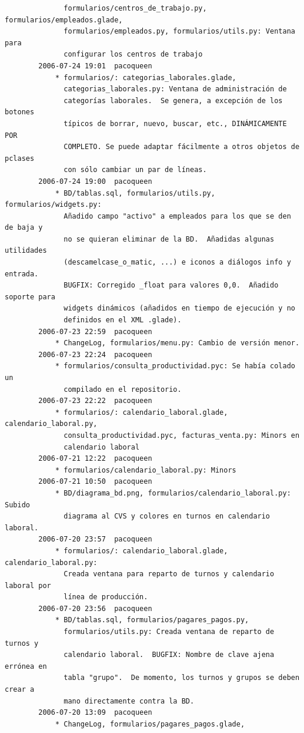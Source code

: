 \documentclass[a4paper]{article}
\begin{document}
\begin{verbatim}
              formularios/centros_de_trabajo.py, formularios/empleados.glade,
              formularios/empleados.py, formularios/utils.py: Ventana para
              configurar los centros de trabajo
        2006-07-24 19:01  pacoqueen
            * formularios/: categorias_laborales.glade,
              categorias_laborales.py: Ventana de administración de
              categorías laborales.  Se genera, a excepción de los botones
              típicos de borrar, nuevo, buscar, etc., DINÁMICAMENTE POR
              COMPLETO. Se puede adaptar fácilmente a otros objetos de pclases
              con sólo cambiar un par de líneas.
        2006-07-24 19:00  pacoqueen
            * BD/tablas.sql, formularios/utils.py, formularios/widgets.py:
              Añadido campo "activo" a empleados para los que se den de baja y
              no se quieran eliminar de la BD.  Añadidas algunas utilidades
              (descamelcase_o_matic, ...) e iconos a diálogos info y entrada.
              BUGFIX: Corregido _float para valores 0,0.  Añadido soporte para
              widgets dinámicos (añadidos en tiempo de ejecución y no
              definidos en el XML .glade).
        2006-07-23 22:59  pacoqueen
            * ChangeLog, formularios/menu.py: Cambio de versión menor.
        2006-07-23 22:24  pacoqueen
            * formularios/consulta_productividad.pyc: Se había colado un
              compilado en el repositorio.
        2006-07-23 22:22  pacoqueen
            * formularios/: calendario_laboral.glade, calendario_laboral.py,
              consulta_productividad.pyc, facturas_venta.py: Minors en
              calendario laboral
        2006-07-21 12:22  pacoqueen
            * formularios/calendario_laboral.py: Minors
        2006-07-21 10:50  pacoqueen
            * BD/diagrama_bd.png, formularios/calendario_laboral.py: Subido
              diagrama al CVS y colores en turnos en calendario laboral.
        2006-07-20 23:57  pacoqueen
            * formularios/: calendario_laboral.glade, calendario_laboral.py:
              Creada ventana para reparto de turnos y calendario laboral por
              línea de producción.
        2006-07-20 23:56  pacoqueen
            * BD/tablas.sql, formularios/pagares_pagos.py,
              formularios/utils.py: Creada ventana de reparto de turnos y
              calendario laboral.  BUGFIX: Nombre de clave ajena errónea en
              tabla "grupo".  De momento, los turnos y grupos se deben crear a
              mano directamente contra la BD.
        2006-07-20 13:09  pacoqueen
            * ChangeLog, formularios/pagares_pagos.glade,

\end{verbatim}
\end{document}
